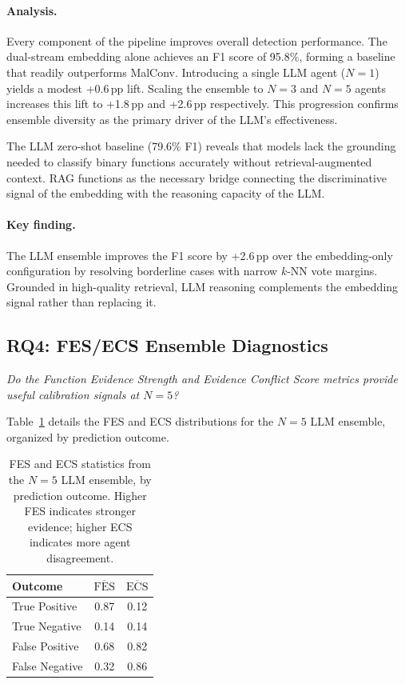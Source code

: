 \documentclass[pdflatex,sn-mathphys-num]{sn-jnl}
\begin{document}
\paragraph{Analysis.}
Every component of the pipeline improves overall detection performance.
The dual-stream embedding alone achieves an F1 score of 95.8\%, forming a baseline
that readily outperforms MalConv. Introducing a single LLM agent ($N{=}1$) yields
a modest +0.6\,pp lift. Scaling the ensemble to $N{=}3$ and $N{=}5$ agents increases
this lift to +1.8\,pp and +2.6\,pp respectively. This progression confirms ensemble
diversity as the primary driver of the LLM's effectiveness.

The LLM zero-shot baseline (79.6\% F1) reveals that models lack the grounding needed
to classify binary functions accurately without retrieval-augmented context. RAG
functions as the necessary bridge connecting the discriminative signal of the
embedding with the reasoning capacity of the LLM.

\paragraph{Key finding.}
The LLM ensemble improves the F1 score by +2.6\,pp over the embedding-only
configuration by resolving borderline cases with narrow $k$-NN vote margins.
Grounded in high-quality retrieval, LLM reasoning complements the embedding
signal rather than replacing it.

\subsection{RQ4: FES/ECS Ensemble Diagnostics}
\label{sec:rq4}
\textit{Do the Function Evidence Strength and Evidence Conflict Score
metrics provide useful calibration signals at $N{=}5$?}

Table~\ref{tab:fes_ecs} details the FES and ECS distributions for the
$N{=}5$ LLM ensemble, organized by prediction outcome.

\begin{table}[t]
\centering
\caption{FES and ECS statistics from the $N{=}5$ LLM ensemble, by
prediction outcome. Higher FES indicates stronger evidence; higher ECS
indicates more agent disagreement.}
\label{tab:fes_ecs}
\small
\begin{tabular}{@{}lcc@{}}
\toprule
\textbf{Outcome} & $\overline{\text{FES}}$ & $\overline{\text{ECS}}$ \\
\midrule
True Positive & 0.87 & 0.12 \\
True Negative & 0.14 & 0.14 \\
False Positive & 0.68 & 0.82 \\
False Negative & 0.32 & 0.86 \\
\bottomrule
\end{tabular}
\end{table}
\end{document}
